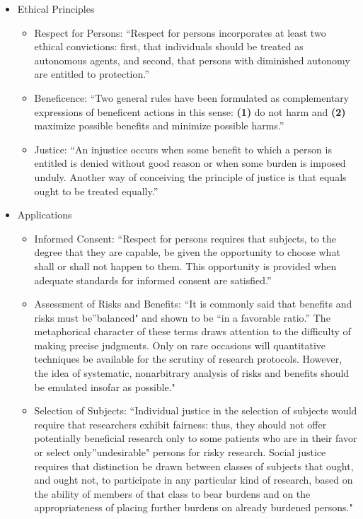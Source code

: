\documentclass[12pt] {article}
\begin{document}
\begin{itemize}
\item
  Ethical Principles

  \begin{itemize}
  \item
    Respect for Persons: ``Respect for persons incorporates at least two
    ethical convictions: first, that individuals should be treated as
    autonomous agents, and second, that persons with diminished autonomy
    are entitled to protection.''
  \item
    Beneficence: ``Two general rules have been formulated as
    complementary expressions of beneficent actions in this sense:
    \textbf{(1)} do not harm and \textbf{(2)} maximize possible benefits
    and minimize possible harms.''
  \item
    Justice: ``An injustice occurs when some benefit to which a person
    is entitled is denied without good reason or when some burden is
    imposed unduly. Another way of conceiving the principle of justice
    is that equals ought to be treated equally.''
  \end{itemize}
\item
  Applications

  \begin{itemize}
  \item
    Informed Consent: ``Respect for persons requires that subjects, to
    the degree that they are capable, be given the opportunity to choose
    what shall or shall not happen to them. This opportunity is provided
    when adequate standards for informed consent are satisfied.''
  \item
    Assessment of Risks and Benefits: ``It is commonly said that
    benefits and risks must be''balanced" and shown to be ``in a
    favorable ratio.'' The metaphorical character of these terms draws
    attention to the difficulty of making precise judgments. Only on
    rare occasions will quantitative techniques be available for the
    scrutiny of research protocols. However, the idea of systematic,
    nonarbitrary analysis of risks and benefits should be emulated
    insofar as possible."
  \item
    Selection of Subjects: ``Individual justice in the selection of
    subjects would require that researchers exhibit fairness: thus, they
    should not offer potentially beneficial research only to some
    patients who are in their favor or select only''undesirable" persons
    for risky research. Social justice requires that distinction be
    drawn between classes of subjects that ought, and ought not, to
    participate in any particular kind of research, based on the ability
    of members of that class to bear burdens and on the appropriateness
    of placing further burdens on already burdened persons."
  \end{itemize}
\end{itemize}
\end{document}
